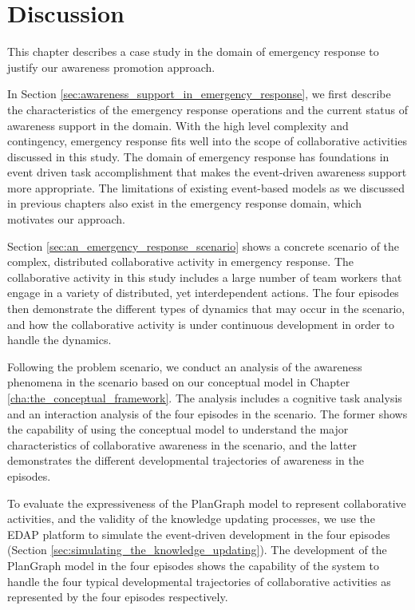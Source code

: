 \section{Discussion} %
\label{sec:summary_and_discussion}
This chapter describes a case study in the domain of emergency response to justify our awareness promotion approach. 

In Section \ref{sec:awareness_support_in_emergency_response}, we first describe the characteristics of the emergency response operations and the current status of awareness support in the domain. With the high level complexity and contingency, emergency response fits well into the scope of collaborative activities discussed in this study. The domain of emergency response has foundations in event driven task accomplishment that makes the event-driven awareness support more appropriate. The limitations of existing event-based models as we discussed in previous chapters also exist in the emergency response domain, which motivates our approach.

Section \ref{sec:an_emergency_response_scenario} shows a concrete scenario of the complex, distributed collaborative activity in emergency response. The collaborative activity in this study includes a large number of team workers that engage in a variety of distributed, yet interdependent actions. The four episodes then demonstrate the different types of dynamics that may occur in the scenario, and how the collaborative activity is under continuous development in order to handle the dynamics.

Following the problem scenario, we conduct an analysis of the awareness phenomena in the scenario based on our conceptual model in Chapter \ref{cha:the_conceptual_framework}. The analysis includes a cognitive task analysis and an interaction analysis of the four episodes in the scenario. The former shows the capability of using the conceptual model to understand the major characteristics of collaborative awareness in the scenario, and the latter demonstrates the different developmental trajectories of awareness in the episodes.

To evaluate the expressiveness of the PlanGraph model to represent collaborative activities, and the validity of the knowledge updating processes, we use the EDAP platform to simulate the event-driven development in the four episodes (Section \ref{sec:simulating_the_knowledge_updating}). The development of the PlanGraph model in the four episodes shows the capability of the system to handle the four typical developmental trajectories of collaborative activities as represented by the four episodes respectively. 

